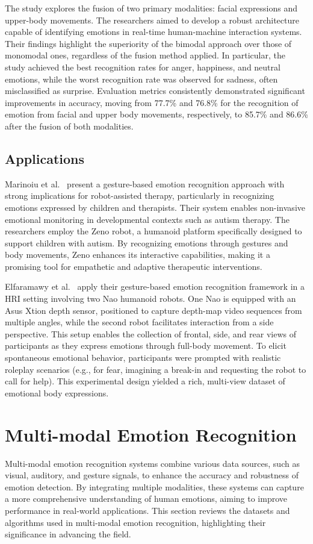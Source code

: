 The study explores the fusion of two primary modalities: facial expressions and upper-body movements. The researchers aimed to develop a robust architecture capable of identifying emotions in real-time human-machine interaction systems. Their findings highlight the superiority of the bimodal approach over those of monomodal ones, regardless of the fusion method applied. In particular, the study achieved the best recognition rates for anger, happiness, and neutral emotions, while the worst recognition rate was observed for sadness, often misclassified as surprise. Evaluation metrics consistently demonstrated significant improvements in accuracy, moving from 77.7\% and 76.8\% for the recognition of emotion from facial and upper body movements, respectively, to 85.7\% and 86.6\% after the fusion of both modalities.

\subsection{Applications}
Marinoiu et al.\ \cite{8578328} present a gesture-based emotion recognition approach with strong implications for robot-assisted therapy, particularly in recognizing emotions expressed by children and therapists. Their system enables non-invasive emotional monitoring in developmental contexts such as autism therapy. The researchers employ the Zeno robot, a humanoid platform specifically designed to support children with autism. By recognizing emotions through gestures and body movements, Zeno enhances its interactive capabilities, making it a promising tool for empathetic and adaptive therapeutic interventions.

Elfaramawy et al.\ \cite{Elfaramawy2017-ab} apply their gesture-based emotion recognition framework in a HRI setting involving two Nao humanoid robots. One Nao is equipped with an Asus Xtion depth sensor, positioned to capture depth-map video sequences from multiple angles, while the second robot facilitates interaction from a side perspective. This setup enables the collection of frontal, side, and rear views of participants as they express emotions through full-body movement. To elicit spontaneous emotional behavior, participants were prompted with realistic roleplay scenarios (e.g., for fear, imagining a break-in and requesting the robot to call for help). This experimental design yielded a rich, multi-view dataset of emotional body expressions.

\section{Multi-modal Emotion Recognition}
Multi-modal emotion recognition systems combine various data sources, such as visual, auditory, and gesture signals, to enhance the accuracy and robustness of emotion detection. By integrating multiple modalities, these systems can capture a more comprehensive understanding of human emotions, aiming to improve performance in real-world applications. This section reviews the datasets and algorithms used in multi-modal emotion recognition, highlighting their significance in advancing the field.

